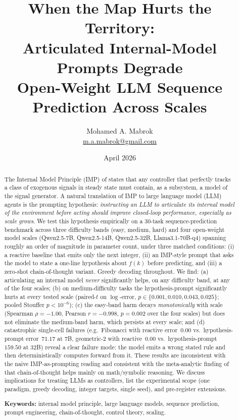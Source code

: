 \documentclass[11pt]{article}
\title{When the Map Hurts the Territory:\\
Articulated Internal-Model Prompts Degrade\\
Open-Weight LLM Sequence Prediction Across Scales}
\author{Mohamed A. Mabrok\\
\href{mailto:m.a.mabrok@gmail.com}{m.a.mabrok@gmail.com}}
\date{April 2026}
\begin{document}
\maketitle

\begin{abstract}
The Internal Model Principle (IMP) of \citet{francis1976internal} states
that any controller that perfectly tracks a class of exogenous signals
in steady state must contain, as a subsystem, a model of the signal
generator.  A natural translation of IMP to large language model (LLM)
agents is the prompting hypothesis: \emph{instructing an LLM to
articulate its internal model of the environment before acting should
improve closed-loop performance, especially as scale grows}.  We test
this hypothesis empirically on a $30$-task sequence-prediction
benchmark across three difficulty bands (easy, medium, hard) and four
open-weight model scales (Qwen2.5-7B, Qwen2.5-14B, Qwen2.5-32B,
Llama3.1-70B-q4) spanning roughly an order of magnitude in
parameter count, under three matched conditions: (i) a reactive
baseline that emits only the next integer, (ii) an IMP-style prompt
that asks the model to state a one-line hypothesis about $f(k)$
before predicting, and (iii) a zero-shot chain-of-thought variant.
Greedy decoding throughout.  We find: (a) articulating an internal
model \emph{never} significantly helps, on any difficulty band, at
any of the four scales; (b) on medium-difficulty tasks the
hypothesis-prompt significantly hurts at every tested scale
(paired-$t$ on $\log$-error, $p \in \{0.001, 0.010, 0.043,
0.025\}$; pooled Stouffer $p < 10^{-6}$); (c) the easy-band harm
decays \emph{monotonically} with scale (Spearman $\rho = -1.00$,
Pearson $r = -0.998$, $p = 0.002$ over the four scales) but does
not eliminate the medium-band harm, which persists at every scale;
and (d) catastrophic single-cell failures (e.g.\ Fibonacci with
reactive error~$0.00$ vs.\ hypothesis-prompt error~$71.17$ at $7$B,
geometric-2 with reactive~$0.00$ vs.\ hypothesis-prompt~$159.50$ at
$32$B) reveal a clear failure mode:
the model emits a wrong stated rule and then deterministically
computes forward from it.  These results are inconsistent with the
naive IMP-as-prompting reading and consistent with the meta-analytic
finding of \citet{sprague2024cot} that chain-of-thought helps mainly
on math/symbolic reasoning.  We discuss implications for treating
LLMs as controllers, list the experimental scope (one paradigm,
greedy decoding, integer targets, single seed), and pre-register
extensions.

\bigskip
\noindent\textbf{Keywords:} internal model principle, large language
models, sequence prediction, prompt engineering, chain-of-thought,
control theory, scaling.
\end{abstract}
\end{document}
